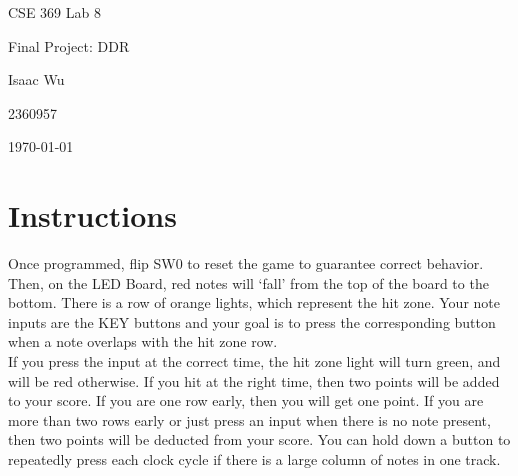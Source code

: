 \documentclass{article}
\date{}
\newenvironment{solution}{\begin{mdframed}[style=SolutionFrame]}{\end{mdframed}}
\begin{document}
    \begin{titlepage}
        \centering
        \null
        \vspace{5cm}
        {\Huge CSE 369 Lab 8\par}
        \vspace{0.5cm}
        {\Large Final Project: DDR \par}
        \vfill
        {\hfill \Large Isaac Wu \par}
        {\hfill \large 2360957 \par}
        {\hfill \large \today \par}
    \end{titlepage}

\section{Instructions}
    \begin{solution}
        Once programmed, flip SW0 to reset the game to guarantee correct behavior. Then, on the LED Board, red notes will `fall' from the top of the board to the bottom. There is a row of orange lights, which represent the hit zone. Your note inputs are the KEY buttons and your goal is to press the corresponding button when a note overlaps with the hit zone row. \\
        If you press the input at the correct time, the hit zone light will turn green, and will be red otherwise. If you hit at the right time, then two points will be added to your score. If you are one row early, then you will get one point. If you are more than two rows early or just press an input when there is no note present, then two points will be deducted from your score. You can hold down a button to repeatedly press each clock cycle if there is a large column of notes in one track.
    \end{solution}
\end{document}
